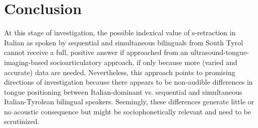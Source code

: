 \documentclass[output=paper]{LSP/langsci}
\begin{document}
\section{Conclusion}
At this stage of investigation, the possible indexical value of s-retraction in Italian as spoken by sequential and simultaneous bilinguals from South Tyrol cannot receive a full, positive answer if approached from an ultrasound-tongue-imaging-based socioarticulatory approach, if only because more (varied and accurate) data are needed. Nevertheless, this approach points to promising directions of investigation because there appears to be non-audible differences in tongue positioning between Italian-dominant vs. sequential and simultaneous Italian-Tyrolean bilingual speakers. Seemingly, these differences generate little or no acoustic consequence but might be sociophonetically relevant and need to be scrutinized.
\end{document}
